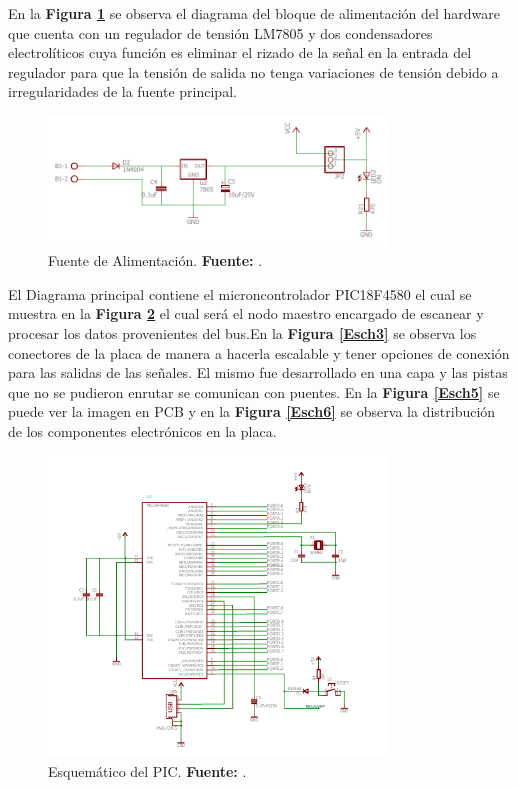En la \textbf{Figura \ref{Esch1}} se observa el diagrama del bloque de alimentación del hardware que cuenta con un regulador de tensión LM7805 y dos condensadores electrolíticos cuya función es eliminar el rizado de la señal en la entrada del regulador para que la tensión de salida no tenga variaciones de tensión debido a irregularidades de la fuente principal. 

\begin{figure}[H]
	\centering
		\includegraphics[width=0.8\textwidth]{./Cap4imagen/Fuente.pdf}
	\caption[Fuente de Alimentación.]{Fuente de Alimentación.\textbf{ Fuente:} \cite{sch1}.}
	\label{Esch1} %
\end{figure}



El Diagrama principal contiene el microncontrolador PIC18F4580 el cual se muestra en la \textbf{Figura \ref{Esch2}} el cual será el nodo maestro encargado de escanear  y procesar los datos provenientes del bus.En la \textbf{Figura \ref{Esch3}} se observa los conectores de la placa de manera a hacerla escalable y tener opciones de conexión para las salidas de las señales. El mismo fue desarrollado en una capa y las pistas que no se pudieron enrutar se comunican con puentes. En la \textbf{Figura \ref{Esch5}} se puede ver la imagen en PCB y en la \textbf{Figura \ref{Esch6}} se observa la distribución de los componentes electrónicos en la placa.


\begin{figure}[H]
	\centering
		\includegraphics[width=0.8\textwidth]{./Cap4imagen/PIC.pdf}
	\caption[Esquemático del PIC.]{Esquemático del PIC.\textbf{ Fuente:} \cite{Tu}.}
	\label{Esch2} %
\end{figure}

